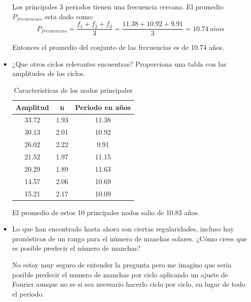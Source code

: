 \documentclass[12pt,letterpaper]{article}
\begin{document}
\begin{itemize}
Los principales 3 periodos tienen una frecuencia cercana. El promedio $P_{frecuencias}$ esta dado como:
$$ P_{frecuencias} = \frac{f_{1}+f_{2}+f_{3}}{3}= \frac{11.38+10.92+9.91}{3} = 10.74   \ a\tilde nos$$

Entonces el promedio del conjunto de las frecuencias es de 10.74 años.

\item ¿Que otros ciclos relevantes encuentras? Proporciona una tabla con las amplitudes de los ciclos. 

\begin{table}[H]
\centering
\begin{tabular}{|c|cc|}

\hline
Amplitud	&	n	&	 Periodo en años\\
\hline
33.72 & 1.93  & 11.38 \\
30.13 & 2.01 & 10.92 \\
26.02 & 2.22 & 9.91 \\
21.52 & 1.97 & 11.15\\
20.29 & 1.89 & 11.63\\
14.57 &2.06  &  10.69 \\
15.21 & 2.17 &  10.09\\
\hline 

\end{tabular}
\caption{Características de los nodos principales}
\end{table}

El promedio de estos 10 principales nodos salio de 10.83 años.

\item Lo que han encontrado hasta ahora son ciertas regularidades, incluso hay pronósticos de un rango para el número de manchas solares. ¿Cómo crees que es posible predecir el número de manchas?

No estoy muy seguro de entender la pregunta pero me imagino que seria posible predecir el numero de manchas por ciclo aplicando un ajuste de Fourier aunque no se si sea necesario hacerlo ciclo por ciclo, en lugar de todo el periodo.


\end{itemize}
   
\end{document}

